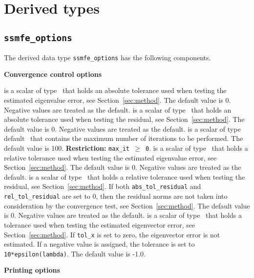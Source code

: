 \section{Derived types}

\subsection{\texttt{ssmfe\_options}}

\label{sec:options}

The derived data type
{\tt ssmfe\_options}
has the following components.

\bigskip
\noindent
{\bf Convergence control options}

\begin{description}
%
 is a scalar of type
\REALDP\ that
holds an absolute tolerance used when testing the estimated eigenvalue 
error, see Section~\ref{sec:method}. 
The default value is 0. %
Negative values are treated as the default.
%
 is a scalar of type
\REALDP\ that
holds an absolute tolerance used when testing the residual, 
see Section~\ref{sec:method}.
The default value is 0.
Negative values are treated as the default.
%
 is a scalar of type default \Integer\ that
contains the maximum number of iterations to be performed.
The default value is 100.
{\bf Restriction:} {\tt max\_it $\ge$ 0}.
%
 is a scalar of type
\REALDP\ that
holds a relative tolerance used when testing the estimated eigenvalue 
error, see Section~\ref{sec:method}. 
The default value is 0.
Negative values are treated as the default.
%
 is a scalar of type
\REALDP\ that
holds a relative tolerance used when testing the residual,
see Section~\ref{sec:method}. 
If both {\tt abs\_tol\_residual} and {\tt rel\_tol\_residual}
are set to 0, then the residual norms are not taken
into consideration by the convergence test,
see Section~\ref{sec:method}.
The default value is 0.
Negative values are treated as the default.
%
 is a scalar of type \REALDP\ that
holds a tolerance used when testing the estimated 
eigenvector error, see Section~\ref{sec:method}. 
If {\tt tol\_x} is set to zero, the eigenvector error is not estimated.
If a negative value is assigned, the tolerance is set to
{\tt 10*epsilon(lambda)}.
The default value is -1.0.
%
\end{description}

\medskip
\noindent
{\bf Printing options}

